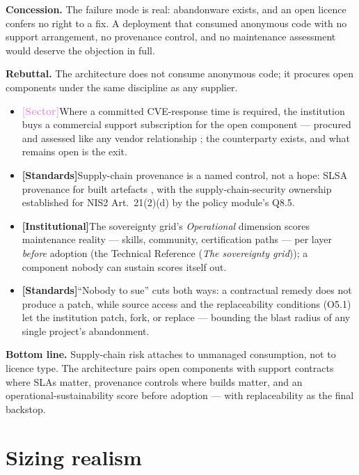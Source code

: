 \documentclass[11pt,a4paper,twoside]{book}
\let\citep\parencite
\newcommand{\evstd}{\textcolor{NavyBlue}{\textbf{[Standards]}}\space}
\newcommand{\evsector}{\textcolor{Plum}{\textbf{[Sector]}}\space}
\newcommand{\evinst}{\textcolor{Slate}{\textbf{[Institutional]}}\space}
\newcommand{\trref}[1]{the Technical Reference (\emph{#1})}
\begin{document}
\begin{answerbox}[Response O2.2]
\textbf{Concession.} The failure mode is real: abandonware exists,
and an open licence confers no right to a fix. A deployment that
consumed anonymous code with no support arrangement, no provenance
control, and no maintenance assessment would deserve the objection
in full.

\medskip
\textbf{Rebuttal.} The architecture does not consume anonymous
code; it procures open components under the same discipline as any
supplier.

\begin{itemize}[leftmargin=1.4em,itemsep=2pt]
  \item \evsector Where a committed CVE-response time is required,
        the institution buys a commercial support subscription for
        the open component --- procured and assessed like any
        vendor relationship \citep{hecvat}; the counterparty
        exists, and what remains open is the exit.
  \item \evstd Supply-chain provenance is a named control, not a
        hope: SLSA provenance for built artefacts
        \citep{slsa-spec}, with the supply-chain-security ownership
        established for NIS2 Art.~21(2)(d) by the policy module's
        Q8.5.
  \item \evinst The sovereignty grid's \emph{Operational} dimension
        scores maintenance reality --- skills, community,
        certification paths --- per layer \emph{before} adoption
        (\trref{The sovereignty grid}); a component nobody can
        sustain scores itself out.
  \item \evstd ``Nobody to sue'' cuts both ways: a contractual
        remedy does not produce a patch, while source access and
        the replaceability conditions (O5.1) let the institution
        patch, fork, or replace --- bounding the blast radius of
        any single project's abandonment.
\end{itemize}

\textbf{Bottom line.} Supply-chain risk attaches to unmanaged
consumption, not to licence type. The architecture pairs open
components with support contracts where SLAs matter, provenance
controls where builds matter, and an operational-sustainability
score before adoption --- with replaceability as the final
backstop.
\end{answerbox}

\section{Sizing realism}
\label{sec:arg-sizing}
\end{document}
